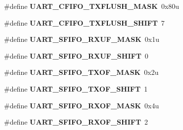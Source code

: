 \begin{DoxyCompactItemize}
\item 
\hypertarget{group___u_a_r_t___register___masks_ga026f6169c18280c4dd4fb93d5b3bf400}{}\#define {\bfseries U\+A\+R\+T\+\_\+\+C\+F\+I\+F\+O\+\_\+\+T\+X\+F\+L\+U\+S\+H\+\_\+\+M\+A\+S\+K}~0x80u\label{group___u_a_r_t___register___masks_ga026f6169c18280c4dd4fb93d5b3bf400}

\item 
\hypertarget{group___u_a_r_t___register___masks_gaebc78a602339988f0960140aeeca4d93}{}\#define {\bfseries U\+A\+R\+T\+\_\+\+C\+F\+I\+F\+O\+\_\+\+T\+X\+F\+L\+U\+S\+H\+\_\+\+S\+H\+I\+F\+T}~7\label{group___u_a_r_t___register___masks_gaebc78a602339988f0960140aeeca4d93}

\item 
\hypertarget{group___u_a_r_t___register___masks_ga05a2524e2dabd91dddf527a472744bab}{}\#define {\bfseries U\+A\+R\+T\+\_\+\+S\+F\+I\+F\+O\+\_\+\+R\+X\+U\+F\+\_\+\+M\+A\+S\+K}~0x1u\label{group___u_a_r_t___register___masks_ga05a2524e2dabd91dddf527a472744bab}

\item 
\hypertarget{group___u_a_r_t___register___masks_ga6c82c75944a1162ef6db65575b3e9c0d}{}\#define {\bfseries U\+A\+R\+T\+\_\+\+S\+F\+I\+F\+O\+\_\+\+R\+X\+U\+F\+\_\+\+S\+H\+I\+F\+T}~0\label{group___u_a_r_t___register___masks_ga6c82c75944a1162ef6db65575b3e9c0d}

\item 
\hypertarget{group___u_a_r_t___register___masks_ga53e9575053054705318b25e04c5b0f62}{}\#define {\bfseries U\+A\+R\+T\+\_\+\+S\+F\+I\+F\+O\+\_\+\+T\+X\+O\+F\+\_\+\+M\+A\+S\+K}~0x2u\label{group___u_a_r_t___register___masks_ga53e9575053054705318b25e04c5b0f62}

\item 
\hypertarget{group___u_a_r_t___register___masks_ga8bcebdd37ab0f89f58d3533577756444}{}\#define {\bfseries U\+A\+R\+T\+\_\+\+S\+F\+I\+F\+O\+\_\+\+T\+X\+O\+F\+\_\+\+S\+H\+I\+F\+T}~1\label{group___u_a_r_t___register___masks_ga8bcebdd37ab0f89f58d3533577756444}

\item 
\hypertarget{group___u_a_r_t___register___masks_ga6caec5dcdf0ff7a7498279579ca8003e}{}\#define {\bfseries U\+A\+R\+T\+\_\+\+S\+F\+I\+F\+O\+\_\+\+R\+X\+O\+F\+\_\+\+M\+A\+S\+K}~0x4u\label{group___u_a_r_t___register___masks_ga6caec5dcdf0ff7a7498279579ca8003e}

\item 
\hypertarget{group___u_a_r_t___register___masks_gab6ac120e58576ef4ff7f368b071c9f63}{}\#define {\bfseries U\+A\+R\+T\+\_\+\+S\+F\+I\+F\+O\+\_\+\+R\+X\+O\+F\+\_\+\+S\+H\+I\+F\+T}~2\label{group___u_a_r_t___register___masks_gab6ac120e58576ef4ff7f368b071c9f63}


\end{DoxyCompactItemize}
